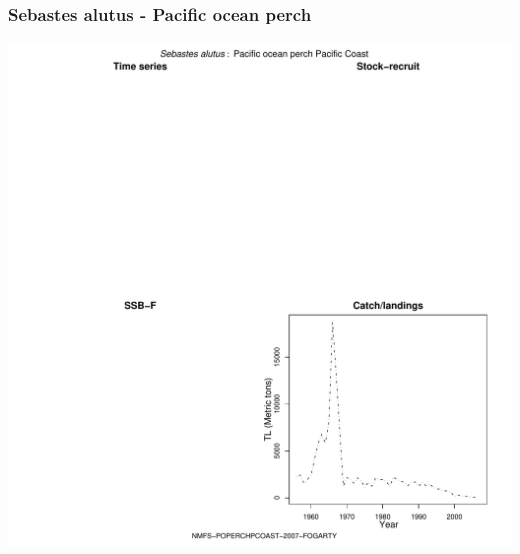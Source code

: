 \subsubsection{Sebastes alutus - Pacific ocean perch}
\begin{center}
\includegraphics[width=1.2\textwidth]{../R/figures/NMFS-POPERCHPCOAST-2007-FOGARTY.pdf}
\end{center}

